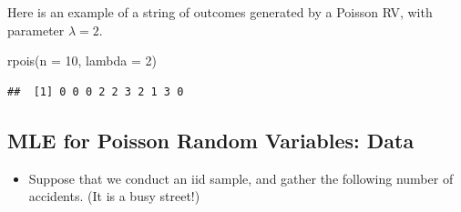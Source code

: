 \documentclass[
]{book}
\newenvironment{Shaded}{\begin{snugshade}}{\end{snugshade}}
\newcommand{\AttributeTok}[1]{\textcolor[rgb]{0.77,0.63,0.00}{#1}}
\newcommand{\DecValTok}[1]{\textcolor[rgb]{0.00,0.00,0.81}{#1}}
\newcommand{\FunctionTok}[1]{\textcolor[rgb]{0.00,0.00,0.00}{#1}}
\newcommand{\NormalTok}[1]{#1}
\providecommand{\tightlist}{%
  \setlength{\itemsep}{0pt}\setlength{\parskip}{0pt}}
\theoremstyle{definition}
\theoremstyle{definition}
\theoremstyle{definition}
\theoremstyle{definition}
\theoremstyle{remark}
\begin{document}
Here is an example of a string of outcomes generated by a Poisson RV, with parameter \(\lambda = 2\).

\begin{Shaded}
\begin{Highlighting}[]
\FunctionTok{rpois}\NormalTok{(}\AttributeTok{n =} \DecValTok{10}\NormalTok{, }\AttributeTok{lambda =} \DecValTok{2}\NormalTok{)}
\end{Highlighting}
\end{Shaded}

\begin{verbatim}
##  [1] 0 0 0 2 2 3 2 1 3 0
\end{verbatim}

\hypertarget{mle-for-poisson-random-variables-data}{%
\subsection{MLE for Poisson Random Variables: Data}\label{mle-for-poisson-random-variables-data}}

\begin{itemize}
\tightlist
\item
  Suppose that we conduct an iid sample, and gather the following number of accidents. (It is a busy street!)
\end{itemize}
\end{document}
